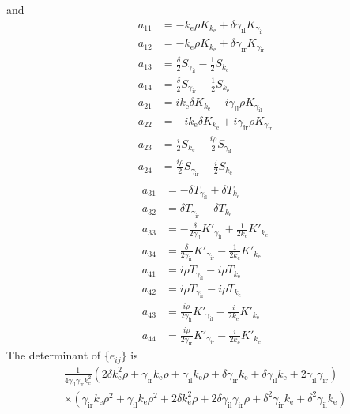 and
\begin{align*}
  a_{11} &= -k_\text{e}\rho K_{k_\text{e}} + \delta \gamma_\text{il} K_{\gamma_\text{il}} \\
  a_{12} &= -k_\text{e}\rho K_{k_\text{e}} + \delta \gamma_\text{ir} K_{\gamma_\text{ir}} \\
  a_{13} &= \frac{\delta}{2}S_{\gamma_\text{il}} - \frac{1}{2} S_{k_\text{e}} \\
  a_{14} &= \frac{\delta}{2}S_{\gamma_\text{ir}} - \frac{1}{2} S_{k_\text{e}} \\
  a_{21} &= i k_\text{e} \delta K_{k_\text{e}} - i\gamma_\text{il}\rho K_{\gamma_\text{il}} \\
  a_{22} &= - i k_\text{e} \delta K_{k_\text{e}} + i \gamma_\text{ir}\rho K_{\gamma_\text{ir}} \\
  a_{23} &= \frac{i}{2} S_{k_\text{e}} - \frac{i\rho}{2} S_{\gamma_\text{il}} \\
  a_{24} &= \frac{i\rho}{2} S_{\gamma_\text{ir}} - \frac{i}{2} S_{k_\text{e}} \\
\end{align*}
\begin{align*}
  a_{31} &= -\delta T_{\gamma_\text{il}} + \delta T_{k_\text{e}} \\
  a_{32} &= \delta T_{\gamma_\text{ir}} - \delta T_{k_\text{e}} \\
  a_{33} &= -\frac{\delta}{2 \gamma_\text{il}} K'_{\gamma_\text{il}} + \frac{1}{2 k_\text{e}} K'_{k_\text{e}} \\
  a_{34} &= \frac{\delta}{2 \gamma_\text{ir}} K'_{\gamma_\text{ir}} - \frac{1}{2 k_\text{e}} K'_{k_\text{e}} \\
  a_{41} &= i \rho T_{\gamma_\text{il}} - i \rho T_{k_\text{e}} \\
  a_{42} &= i \rho T_{\gamma_\text{ir}} - i \rho T_{k_\text{e}} \\
  a_{43} &= \frac{i\rho}{2 \gamma_\text{il}}K'_{\gamma_\text{il}} - \frac{i}{2 k_\text{e}} K'_{k_\text{e}} \\
  a_{44} &= \frac{i\rho}{2 \gamma_\text{ir}} K'_{\gamma_\text{ir}} - \frac{i}{2k_\text{e}}K'_{k_\text{e}}
\end{align*}
The determinant of $\{e_{ij}\}$ is
\begin{multline*}
  \frac{1}{4 \gamma_\text{il} \gamma_\text{ir} k_\text{e}^2}\left(2 \delta k_\text{e}^2 \rho+\gamma_\text{ir} k_\text{e} \rho+\gamma_\text{il} k_\text{e} \rho+\delta \gamma_\text{ir} k_\text{e}+\delta \gamma_\text{il} k_\text{e}+2 \gamma_\text{il} \gamma_\text{ir}\right)\\ 
  \times\left(\gamma_\text{ir} k_\text{e} \rho^2+\gamma_\text{il} k_\text{e} \rho^2+2 \delta k_\text{e}^2 \rho+2 \delta \gamma_\text{il} \gamma_\text{ir} \rho+\delta^2 \gamma_\text{ir} k_\text{e}+\delta^2 \gamma_\text{il} k_\text{e}\right)
\end{multline*}

